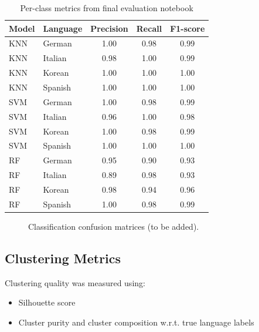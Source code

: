 \documentclass[a4paper,14pt]{extarticle}
\begin{document}
\begin{table}[h]
    \centering
    \caption{Per-class metrics from final evaluation notebook}
    \begin{tabular}{|l|l|c|c|c|}
        \hline
        Model & Language & Precision & Recall & F1-score \\
        \hline
        KNN & German  & 1.00 & 0.98 & 0.99 \\
        KNN & Italian & 0.98 & 1.00 & 0.99 \\
        KNN & Korean  & 1.00 & 1.00 & 1.00 \\
        KNN & Spanish & 1.00 & 1.00 & 1.00 \\
        \hline
        SVM & German  & 1.00 & 0.98 & 0.99 \\
        SVM & Italian & 0.96 & 1.00 & 0.98 \\
        SVM & Korean  & 1.00 & 0.98 & 0.99 \\
        SVM & Spanish & 1.00 & 1.00 & 1.00 \\
        \hline
        RF & German  & 0.95 & 0.90 & 0.93 \\
        RF & Italian & 0.89 & 0.98 & 0.93 \\
        RF & Korean  & 0.98 & 0.94 & 0.96 \\
        RF & Spanish & 1.00 & 0.98 & 0.99 \\
        \hline
    \end{tabular}
    \label{tab:per_class_metrics}
\end{table}

\begin{figure}[h]
    \centering
    \caption{Classification confusion matrices (to be added).}
    \label{fig:confusion_matrices_placeholder}
\end{figure}

\subsection{Clustering Metrics}
Clustering quality was measured using:
\begin{itemize}
    \item Silhouette score
    \item Cluster purity and cluster composition w.r.t. true language labels
\end{itemize}
\end{document}
